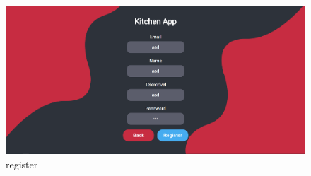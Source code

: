 \documentclass[a4paper]{report}
\begin{document}
\begin{figure}[H]
    \centering 
    \includegraphics[width=\textwidth]{images/generate.png}  
    \caption{register}
    \label{fig:register}
\end{figure}
\end{document}
